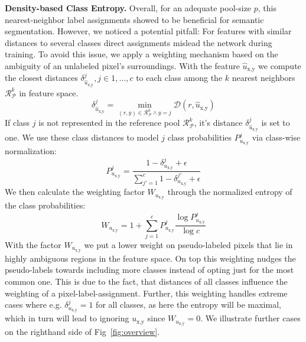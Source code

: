 \documentclass[letterpaper]{article} %
\begin{document}

\noindent\textbf{Density-based Class Entropy.}
Overall, for an adequate pool-size $p$, this nearest-neighbor label assignments showed to be beneficial for semantic segmentation.
However, we noticed a potential pitfall: For features with similar distances to several classes direct assignments mislead the network during training.
To avoid this issue, we apply a weighting mechanism based on the ambiguity of an unlabeled pixel's surroundings.
With the feature $\hat u_{\text{x},\text{y}}$ we compute the closest distances $\delta^j_{\hat u_{\text{x},\text{y}}}, j\in {1,\dots,c}$ to each class among the $k$ nearest neighbors $\mathcal{R}_\mathcal{\mathcal{P}}^k$ in feature space. 
\begin{equation}\label{eq:dist_entr}
    \delta^j_{\hat u_{\text{x},\text{y}}} = 
        \min_{(r,y) \in \mathcal{R}_\mathcal{P}^k\land y=j} \mathcal{D}(r, \hat u_{\text{x},\text{y}})
\end{equation}
If class $j$ is not represented in the reference pool $\mathcal{R}_\mathcal{P}^k$, it's distance $\delta^j_{\hat u_{\text{x},\text{y}}}$ is set to one.
We use these class distances to model $j$ class probabilities $\mathit{P}^j_{u_{\text{x},\text{y}}}$ via class-wise normalization:
\begin{equation}\label{eq:class_prob}
    \mathit{P}^j_{u_{\text{x},\text{y}}} = \frac{1- \delta^j_{u_{\text{x},\text{y}}}+\epsilon}{\sum_{j'=1}^c 1- \delta^{j'}_{u_{\text{x},\text{y}}}+\epsilon} 
\end{equation}
We then calculate the weighting factor $W_{u_{\text{x},\text{y}}}$ through the normalized entropy of the class probabilities:
\begin{equation}\label{eq:entropy}
    W_{u_{\text{x},\text{y}}} = 1 + \sum^c_{j=1} \mathit{P}^j_{u_{\text{x},\text{y}}} \frac{\log \mathit{P}^j_{u_{\text{x},\text{y}}}}{\log c}
\end{equation}
With the factor $W_{u_{\text{x},\text{y}}}$ we put a lower weight on pseudo-labeled pixels that lie in highly ambiguous regions in the feature space.
On top this weighting nudges the pseudo-labels towards including more classes instead of opting just for the most common one.
This is due to the fact, that distances of all classes influence the weighting of a pixel-label-assignment.
Further, this weighting handles extreme cases where e.g.  $\delta^j_{u_{\text{x},\text{y}}} = 1$ for all classes, as here the entropy will be maximal, which in turn will lead to ignoring $u_{\text{x},\text{y}}$ since $W_{u_{\text{x},\text{y}}} = 0$.
We illustrate further cases on the righthand side of Fig~\ref{fig:overview}.
\end{document}

